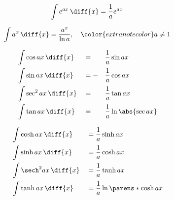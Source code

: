 \vspace*{-\parskip} %
\begin{myminipage}[t]{0.5\linewidth}
    \begin{HackEquationLeftAlign}
    \begin{equation*}
        \int{e^{ax} \,\diff{x}} = \frac{1}{a} e^{ax}
    \end{equation*}
    \end{HackEquationLeftAlign}%
\end{myminipage}%
\begin{myminipage}[t]{0.5\linewidth}
    \begin{HackEquationLeftAlign}
    \begin{equation*}
        \int{a^x \,\diff{x}}
            = \frac{a^x}{\ln{a}}
            ,\quad
            {\color{extranotecolor}
                a \neq 1
            }
    \end{equation*}
    \end{HackEquationLeftAlign}%
\end{myminipage}%


\begin{myminipage}[t]{0.5\linewidth}
    \begin{HackEquationLeftAlign}
    \begin{alignat*}{3}
        &\int{\cos{ax} \,\diff{x}} &&= && \frac{1}{a} \sin{ax} \\
        &\int{\sin{ax} \,\diff{x}} &&= -&& \frac{1}{a} \cos{ax} \\
        &\int{\sec^2{ax} \,\diff{x}} &&= && \frac{1}{a} \tan{ax} \\
        &\int{\tan{ax} \,\diff{x}} &&= && \frac{1}{a} \ln{\abs{\sec{ax}}}
    \end{alignat*}
    \end{HackEquationLeftAlign}%
\end{myminipage}%
\begin{myminipage}[t]{0.5\linewidth}
    \begin{HackEquationLeftAlign}
    \begin{alignat*}{2}
        &\int{\cosh{ax} \,\diff{x}} &&= \frac{1}{a} \sinh{ax} \\
        &\int{\sinh{ax} \,\diff{x}} &&= \frac{1}{a} \cosh{ax} \\
        &\int{\sech^2{ax} \,\diff{x}} &&= \frac{1}{a} \tanh{ax} \\
        &\int{\tanh{ax} \,\diff{x}} &&= \frac{1}{a} \ln{\parens*{\cosh{ax}}}
    \end{alignat*}
    \end{HackEquationLeftAlign}%
\end{myminipage}


